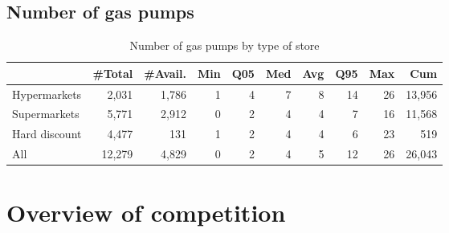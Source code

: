 \documentclass[11pt]{article}
\begin{document}
\subsection{Number of gas pumps}

\begin{table}[H]
\caption{Number of gas pumps by type of store}
\small

\begin{tabular}{lrrrrrrrrr}
\toprule
{} &     \#Total &    \#Avail. &        Min &        Q05 &        Med &        Avg &        Q95 &        Max &        Cum \\
\midrule
Hypermarkets  &      2,031 &      1,786 &          1 &          4 &          7 &          8 &         14 &         26 &     13,956 \\
Supermarkets  &      5,771 &      2,912 &          0 &          2 &          4 &          4 &          7 &         16 &     11,568 \\
Hard discount &      4,477 &        131 &          1 &          2 &          4 &          4 &          6 &         23 &        519 \\
\midrule
All           &     12,279 &      4,829 &          0 &          2 &          4 &          5 &         12 &         26 &     26,043 \\
\bottomrule
\end{tabular}

\end{table}

\section{Overview of competition}
\end{document}
